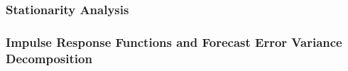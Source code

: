 \documentclass[12pt]{scrartcl}
\numberwithin{equation}{section}				%
\begin{document}
    \subsubsection{Stationarity Analysis}
    
    
    
    \subsubsection{Impulse Response Functions and Forecast Error Variance Decomposition}
    
\end{document}

